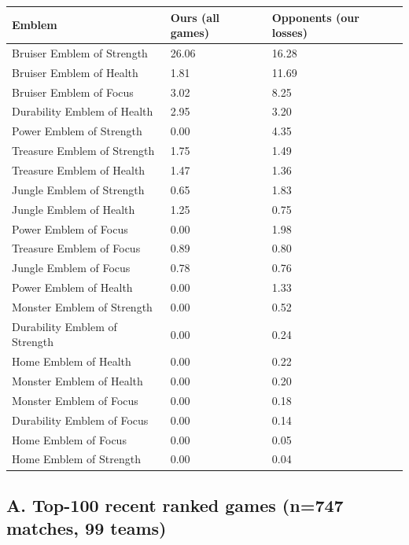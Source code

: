 \documentclass[
  10pt,
]{article}
\newcounter{none} %
\begin{document}
{\def\LTcaptype{none} %
\begin{longtable}[]{@{}lll@{}}
\toprule\noalign{}
Emblem & Ours (all games) & Opponents (our losses) \\
\midrule\noalign{}
\endhead
\bottomrule\noalign{}
\endlastfoot
Bruiser Emblem of Strength & 26.06 & 16.28 \\
Bruiser Emblem of Health & 1.81 & 11.69 \\
Bruiser Emblem of Focus & 3.02 & 8.25 \\
Durability Emblem of Health & 2.95 & 3.20 \\
Power Emblem of Strength & 0.00 & 4.35 \\
Treasure Emblem of Strength & 1.75 & 1.49 \\
Treasure Emblem of Health & 1.47 & 1.36 \\
Jungle Emblem of Strength & 0.65 & 1.83 \\
Jungle Emblem of Health & 1.25 & 0.75 \\
Power Emblem of Focus & 0.00 & 1.98 \\
Treasure Emblem of Focus & 0.89 & 0.80 \\
Jungle Emblem of Focus & 0.78 & 0.76 \\
Power Emblem of Health & 0.00 & 1.33 \\
Monster Emblem of Strength & 0.00 & 0.52 \\
Durability Emblem of Strength & 0.00 & 0.24 \\
Home Emblem of Health & 0.00 & 0.22 \\
Monster Emblem of Health & 0.00 & 0.20 \\
Monster Emblem of Focus & 0.00 & 0.18 \\
Durability Emblem of Focus & 0.00 & 0.14 \\
Home Emblem of Focus & 0.00 & 0.05 \\
Home Emblem of Strength & 0.00 & 0.04 \\
\end{longtable}
}

\subsection{A. Top-100 recent ranked games (n=747 matches, 99
teams)}\label{a-top-100-recent-ranked-games-n747-matches-99-teams}
\end{document}
